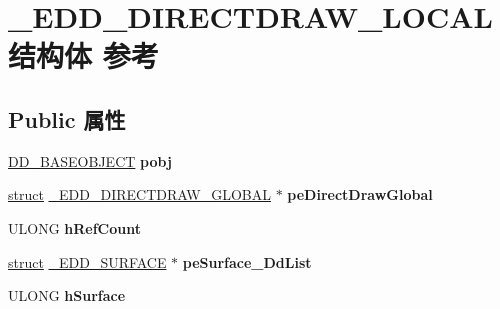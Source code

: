 \hypertarget{struct___e_d_d___d_i_r_e_c_t_d_r_a_w___l_o_c_a_l}{}\section{\+\_\+\+E\+D\+D\+\_\+\+D\+I\+R\+E\+C\+T\+D\+R\+A\+W\+\_\+\+L\+O\+C\+A\+L结构体 参考}
\label{struct___e_d_d___d_i_r_e_c_t_d_r_a_w___l_o_c_a_l}
\subsection*{Public 属性}
\begin{DoxyCompactItemize}
\item 
\mbox{\label{struct___e_d_d___d_i_r_e_c_t_d_r_a_w___l_o_c_a_l_a5ef10057114aa4ba6941cb20a62ab03e}} 
\hyperlink{struct___d_d___b_a_s_e_o_b_j_e_c_t}{D\+D\+\_\+\+B\+A\+S\+E\+O\+B\+J\+E\+CT} {\bfseries pobj}
\item 
\mbox{\label{struct___e_d_d___d_i_r_e_c_t_d_r_a_w___l_o_c_a_l_a749d8d1c32bd050d830c434cb70cf49b}} 
\hyperlink{interfacestruct}{struct} \hyperlink{struct___e_d_d___d_i_r_e_c_t_d_r_a_w___g_l_o_b_a_l}{\+\_\+\+E\+D\+D\+\_\+\+D\+I\+R\+E\+C\+T\+D\+R\+A\+W\+\_\+\+G\+L\+O\+B\+AL} $\ast$ {\bfseries pe\+Direct\+Draw\+Global}
\item 
\mbox{\label{struct___e_d_d___d_i_r_e_c_t_d_r_a_w___l_o_c_a_l_af561b87605eac7a250c520ca1b1759d8}} 
U\+L\+O\+NG {\bfseries h\+Ref\+Count}
\item 
\mbox{\label{struct___e_d_d___d_i_r_e_c_t_d_r_a_w___l_o_c_a_l_a5a0fb802f6686fb84020beeff7f5dbd9}} 
\hyperlink{interfacestruct}{struct} \hyperlink{struct___e_d_d___s_u_r_f_a_c_e}{\+\_\+\+E\+D\+D\+\_\+\+S\+U\+R\+F\+A\+CE} $\ast$ {\bfseries pe\+Surface\+\_\+\+Dd\+List}
\item 
\mbox{\label{struct___e_d_d___d_i_r_e_c_t_d_r_a_w___l_o_c_a_l_acee3bdb6f598d1e165d9279411bacb35}} 
U\+L\+O\+NG {\bfseries h\+Surface}
\item 
\mbox{\label{struct___e_d_d___d_i_r_e_c_t_d_r_a_w___l_o_c_a_l_ae6458f3883ef36b1a9dc97812e4f4538}} 

\end{DoxyCompactItemize}
